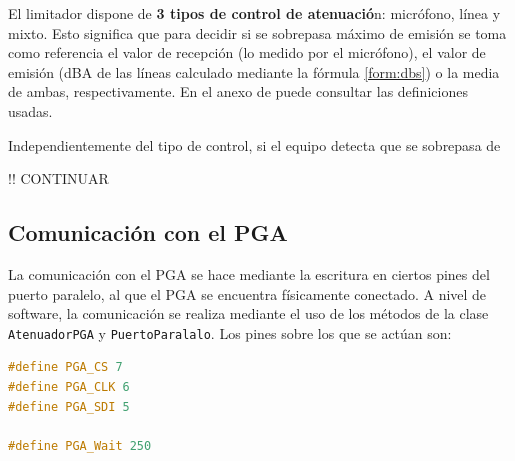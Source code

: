 El limitador dispone de \textbf{3 tipos de control de atenuació}n: micrófono, línea y mixto. Esto significa que para decidir si se sobrepasa máximo de emisión se toma como referencia el valor de recepción (lo medido por el micrófono), el valor de emisión (dBA de las líneas calculado mediante la fórmula \ref{form:dbs}) o la media de ambas, respectivamente. En el anexo de  puede consultar las definiciones usadas.

Independientemente del tipo de control, si el equipo detecta que se sobrepasa de

!! CONTINUAR

\subsection{Comunicación con el PGA}

La comunicación con el PGA se hace mediante la escritura en ciertos pines del puerto paralelo, al que el PGA se encuentra físicamente conectado. A nivel de software, la comunicación se realiza mediante el uso de los métodos de la clase \verb|AtenuadorPGA| y \verb|PuertoParalalo|. Los pines sobre los que se actúan son: \\

\begin{lstlisting}[language=c++, label={lst:lsm7-pga}, caption={Pines del puerto paralelo conectados al PGA}]
#define PGA_CS 7
#define PGA_CLK 6
#define PGA_SDI 5

#define PGA_Wait 250
\end{lstlisting}